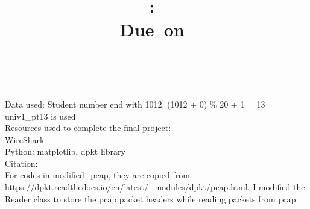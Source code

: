 \documentclass{article}
\title{
\vspace{2in}
\textmd{\textbf{\hmwkClass:\ \hmwkTitle}}\\
\normalsize\vspace{0.1in}\small{Due\ on\ \hmwkDueDate}\\
\vspace{0.1in}
\vspace{3in}
}
\author{\textbf{\hmwkAuthorName}\\ \textbf{\hmwkAuthorID}}
\date{} %
\begin{document}
\maketitle
\clearpage



Data used:
Student number end with 1012. (1012 + 0) \% 20 + 1 = 13\\
univ1\_pt13 is used\\

Resources used to complete the final project:\\
WireShark\\
Python: matplotlib, dpkt library\\

Citation:\\
For codes in modified\_pcap, they are copied from https://dpkt.readthedocs.io/en/latest/\_modules/dpkt/pcap.html. I modified the Reader class to store the pcap packet headers while reading packets from pcap\\
\end{document}

